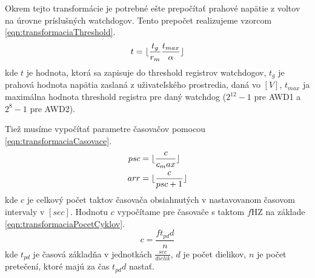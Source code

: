 \documentclass[main.tex]{subfiles}
\begin{document}
	Okrem tejto transformácie je potrebné ešte prepočítať prahové napätie z voltov na úrovne príslušných watchdogov. Tento prepočet realizujeme vzorcom \cref{eqn:transformaciaThreshold}.
	\begin{equation}
	 	t = \lfloor\frac{t_g}{r_m} \frac{t_{max}}{\alpha}\rfloor
	\label{eqn:transformaciaThreshold}
	\end{equation}
	kde $t$ je hodnota, ktorá sa zapisuje do threshold registrov watchdogov, $t_g$ je prahová hodnota napätia zaslaná z uživateľského prostredia, daná vo $[V]$, $t_{max}$ ja maximálna hodnota threshold registra pre daný watchdog ($2^{12}-1$ pre AWD1 a $2^{8}-1$ pre AWD2).
	
	Tiež musíme vypočítať parametre časovačov pomocou \cref{eqn:transformaciaCasovace}.
	\begin{equation}
		\begin{split}
				psc &= \lfloor\frac{c}{c_max}\rfloor \\
				arr &= \lfloor\frac{c}{psc + 1}\rfloor \\
		\end{split}
		\label{eqn:transformaciaCasovace}
	\end{equation}
	kde $c$ je celkový počet taktov časovača obsiahnutých v nastavovanom časovom intervaly v $[sec]$. Hodnotu $c$ vypočítame pre časovače s taktom $f$HZ na základe \cref{eqn:transformaciaPocetCyklov}.
	\begin{equation}
		c = \frac{f t_{pd} d }{n}
		\label{eqn:transformaciaPocetCyklov}
	\end{equation}
	kde $t_{pd}$ je časová základňa v jednotkách $\frac{sec}{dielik}$, $d$ je počet dielikov, $n$ je počet pretečení, ktoré majú za čas $t_{pd}d$ nastať.
\end{document}
